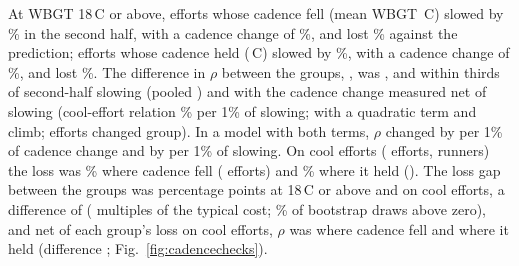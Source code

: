 \documentclass[12pt]{article}
\newcommand{\degC}{\,\textdegree C}
\begin{document}
At WBGT 18\degC{} or above, efforts whose cadence fell (mean WBGT \spadjWbgtFell\degC) slowed by \spadjSlowFell\% in the second half, with a cadence change of \spadjCadFell\%, and lost \spadjLossFell\% against the prediction; efforts whose cadence held (\spadjWbgtHeld\degC) slowed by \spadjSlowHeld\%, with a cadence change of \spadjCadHeld\%, and lost \spadjLossHeld\%. The difference in $\rho$ between the groups, \spadjContrast, was \spadjThirdLow, \spadjThirdMid{} and \spadjThirdHigh{} within thirds of second-half slowing (pooled \spadjThirdPooled) and \spadjAdjContrast{} with the cadence change measured net of slowing (cool-effort relation \spadjCoolRel\% per 1\% of slowing; \spadjAdjContrastQuad{} with a quadratic term and climb; \spadjMoved{} efforts changed group). In a model with both terms, $\rho$ changed by \spadjJointCad{} per 1\% of cadence change and by \spadjJointSlow{} per 1\% of slowing. On cool efforts (\spadjCoolN{} efforts, \spadjCoolRunners{} runners) the loss was \spadjCoolLossFell\% where cadence fell (\spadjCoolFellN{} efforts) and \spadjCoolLossHeld\% where it held (\spadjCoolHeldN). The loss gap between the groups was \spadjGapHot{} percentage points at 18\degC{} or above and \spadjGapCool{} on cool efforts, a difference of \spadjGapDiff{} (\spadjGapDiffRho{} multiples of the typical cost; \spadjGapDiffShare\% of bootstrap draws above zero), and net of each group's loss on cool efforts, $\rho$ was \spadjNetFell{} where cadence fell and \spadjNetHeld{} where it held (difference \spadjNetDiff; Fig.~\ref{fig:cadencechecks}).
\end{document}
